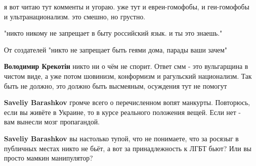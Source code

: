 \begin{itemize}
\begin{itemize}
я вот читаю тут комменты и угораю. уже тут и евреи-гомофобы, и геи-гомофобы и ультранационализм. это смешно, но грустно.

 

"никто никому не запрещает в быту российский язык. и ты это знаешь."

От создателей "никто не запрещает быть геями дома, парады ваши зачем"


 
\textbf{Володимир Крекотін} никто ни о чём не спорит. Ответ смм - это
вульгарщина в чистом виде, а уже потом шовинизм, конформизм и рагульский
национализм. Так быть не должно, это должно быть высмеяным, осуждения тут не
помогут

 
\textbf{Saveliy Barashkov} громче всего о перечисленном вопят манкурты.
Повторюсь, если вы живёте в Украине, то в курсе реального положения вещей. Если
нет - вам вынесли мозг пропагандой.

 
\textbf{Saveliy Barashkov} вы настолько тупой, что не понимаете, что за росязыг
в публичных местах никто не бьёт, а вот за принадлежность к ЛГБТ бьют? Или вы
просто мамкин манипулятор?

 

\end{itemize}
\end{itemize}
